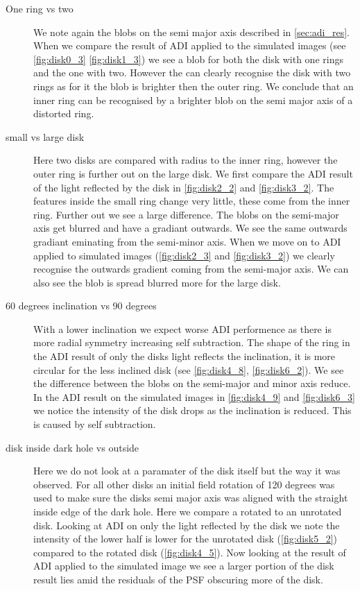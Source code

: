 \begin{description}
\item[One ring vs two]{
We note again the blobs on the semi major axis described in \autoref{sec:adi_res}. When we compare the result of \ac{ADI} applied to the simulated images (see \autoref{fig:disk0_3} \ref{fig:disk1_3}) we see a blob for both the disk with one rings and the one with two. However the can clearly recognise the disk with two rings as for it the blob is brighter then the outer ring. We conclude that an inner ring can be recognised by a brighter blob on the semi major axis of a distorted ring.}
\item[small vs large disk]{
Here two disks are compared with radius to the inner ring, however the outer ring is further out on the large disk. We first compare the \ac{ADI} result of the light reflected by the disk in \autoref{fig:disk2_2} and \autoref{fig:disk3_2}. The features inside the small ring change very little, these come from the inner ring. Further out we see a large difference. The blobs on the semi-major axis get blurred and have a gradiant outwards. We see the same outwards gradiant eminating from the semi-minor axis. When we move on to \ac{ADI} applied to simulated images (\autoref{fig:disk2_3} and \autoref{fig:disk3_2}) we clearly recognise the outwards gradient coming from the semi-major axis. We can also see the blob is spread blurred more for the large disk.
}
\item[60 degrees inclination vs 90 degrees]{
With a lower inclination we expect worse \ac{ADI} performence as there is more radial symmetry increasing self subtraction. The shape of the ring in the \ac{ADI} result of only the disks light reflects the inclination, it is more circular for the less inclined disk (see \autoref{fig:disk4_8}, \autoref{fig:disk6_2}). We see the difference between the blobs on the semi-major and minor axis reduce. In the \ac{ADI} result on the simulated images in \autoref{fig:disk4_9} and \autoref{fig:disk6_3} we notice the intensity of the disk drops as the inclination is reduced. This is caused by self subtraction. 
}
\item[disk inside dark hole vs outside]{
Here we do not look at a paramater of the disk itself but the way it was observed. For all other disks an initial field rotation of 120 degrees was used to make sure the disks semi major axis was aligned with the straight inside edge of the dark hole. Here we compare a rotated to an unrotated disk. Looking at \ac{ADI} on only the light reflected by the disk we note the intensity of the lower half is lower for the unrotated disk (\autoref{fig:disk5_2}) compared to the rotated disk (\autoref{fig:disk4_5}). Now looking at the result of \ac{ADI} applied to the simulated image we see a larger portion of the disk result lies amid the residuals of the \ac{PSF} obscuring more of the disk.
}
\end{description}

